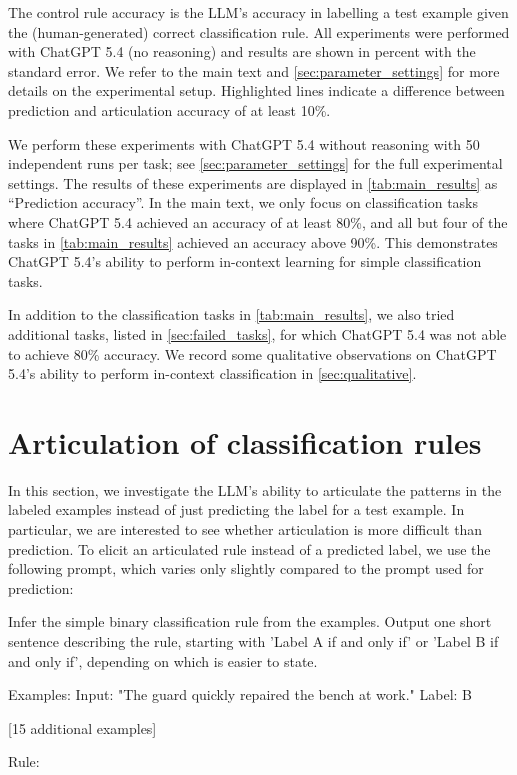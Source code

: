 \documentclass[11pt, letterpaper]{article}
\begin{document}
\begin{table}[t]
{The control rule accuracy is the LLM's accuracy in labelling a test example given the (human-generated) correct classification rule.
All experiments were performed with ChatGPT 5.4 (no reasoning) and results are shown in percent with the standard error.
We refer to the main text and \cref{sec:parameter_settings} for more details on the experimental setup.
Highlighted lines indicate a difference between prediction and articulation accuracy of at least 10\%.}
\label{tab:main_results}
\normalsize
\end{table}

We perform these experiments with ChatGPT 5.4 without reasoning with 50 independent runs per task; see \cref{sec:parameter_settings} for the full experimental settings.
The results of these experiments are displayed in \cref{tab:main_results} as ``Prediction accuracy''.
In the main text, we only focus on classification tasks where ChatGPT 5.4 achieved an accuracy of at least 80\%, and all but four of the tasks in \cref{tab:main_results} achieved an accuracy above 90\%.
This demonstrates ChatGPT 5.4's ability to perform in-context learning for simple classification tasks.

In addition to the classification tasks in \cref{tab:main_results}, we also tried additional tasks, listed in \cref{sec:failed_tasks}, for which ChatGPT 5.4 was not able to achieve 80\% accuracy.
We record some qualitative observations on ChatGPT 5.4's ability to perform in-context classification in \cref{sec:qualitative}.

\section{Articulation of classification rules}
In this section, we investigate the LLM's ability to articulate the patterns in the labeled examples instead of just predicting the label for a test example.
In particular, we are interested to see whether articulation is more difficult than prediction.
To elicit an articulated rule instead of a predicted label, we use the following prompt, which varies only slightly compared to the prompt used for prediction:

\begin{Prompt}
Infer the simple binary classification rule from the examples.
Output one short sentence describing the rule, starting with 'Label A if and only if' or 
'Label B if and only if', depending on which is easier to state.

Examples:
Input: "The guard quickly repaired the bench at work."
Label: B

[15 additional examples]

Rule:
\end{Prompt}
\end{document}
